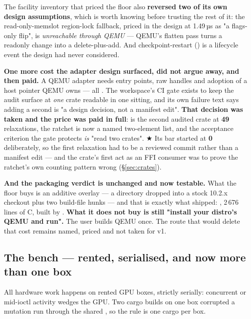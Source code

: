 \documentclass[10.5pt]{article}
\begin{document}
The facility inventory that priced the floor also \textbf{reversed two of its own design
assumptions}, which is worth knowing before trusting the rest of it: the read-only-memslot
region-lock fallback, priced in the design at 1.49\,µs as "a flags-only flip", is
\emph{unreachable through QEMU} — QEMU's flatten pass turns a readonly change into a
delete-plus-add. And checkpoint-restart () is a lifecycle event the design had
never considered.

\textbf{One more cost the adapter design surfaced, did not argue away, and then paid.} A QEMU
adapter needs  entry points, raw  handles and adoption of a
host pointer QEMU owns — all . The workspace's CI gate exists to keep the audit
surface at \emph{one} crate readable in one sitting, and its own failure text says adding a
second is "a design decision, not a manifest edit". \textbf{That decision was taken and the
price was paid in full}:  is the second audited  crate at
\textbf{49} relaxations, the ratchet is now a named two-element list, and the acceptance
criterion the gate protects \emph{is} "read two crates". ★ Its bar started at \textbf{0}
deliberately, so the first relaxation had to be a reviewed commit rather than a manifest edit —
and the crate's first act as an FFI consumer was to prove the ratchet's own counting pattern
wrong (\S\ref{sec:crates}).

\textbf{And the packaging verdict is unchanged and now testable.} What the floor buys is an
additive overlay — a directory dropped into a stock 10.2.x checkout plus two build-file hunks —
and that is exactly what shipped: , 2\,676 lines of C, built by
. \textbf{What it does not buy is still "install your distro's
QEMU and run".} The user builds QEMU once. The  route that would delete that cost
remains named, priced and not taken for v1.

\subsection{The bench --- rented, serialised, and now more than one box}
\label{sec:bench}

All hardware work happens on rented GPU boxes, strictly serially: concurrent or mid-ioctl
activity wedges the GPU. Two cargo builds on one box corrupted a mutation run through the shared
, so the rule is one cargo per box.
\end{document}
